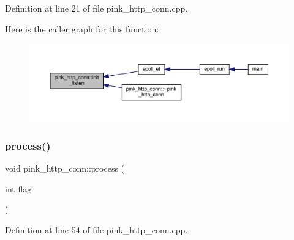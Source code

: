 Definition at line 21 of file pink\+\_\+http\+\_\+conn.\+cpp.

Here is the caller graph for this function\+:
\nopagebreak
\begin{figure}[H]
\begin{center}
\leavevmode
\includegraphics[width=350pt]{classpink__http__conn_a14ed30d2643f52ec95c45b11b13b2411_icgraph}
\end{center}
\end{figure}
\mbox{\label{classpink__http__conn_a41ca12d76d0056562633f27d456d0b62}} 
\subsubsection{\texorpdfstring{process()}{process()}}
{\footnotesize\ttfamily void pink\+\_\+http\+\_\+conn\+::process (\begin{DoxyParamCaption}\item[{int}]{flag }\end{DoxyParamCaption})}



Definition at line 54 of file pink\+\_\+http\+\_\+conn.\+cpp.

